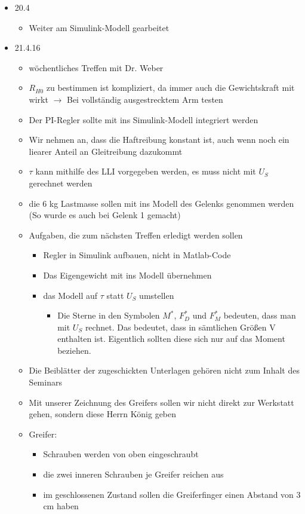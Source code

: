 \documentclass[a4paper,12pt]{article}
\begin{document}
\begin{itemize}
	\item 20.4
	\begin{itemize}
		\item Weiter am Simulink-Modell gearbeitet
	\end{itemize}
	\item 21.4.16
	\begin{itemize}
		\item wöchentliches Treffen mit Dr. Weber
		\item $R_{H0}$ zu bestimmen ist kompliziert, da immer auch die Gewichtskraft mit wirkt $\rightarrow$ Bei vollständig ausgestrecktem Arm testen
		\item Der PI-Regler sollte mit ins Simulink-Modell integriert werden
		\item Wir nehmen an, dass die Haftreibung konstant ist, auch wenn noch ein liearer Anteil an Gleitreibung dazukommt
		\item $\tau$ kann mithilfe des LLI vorgegeben werden, es muss nicht mit $U_S$ gerechnet werden
		\item die 6 kg Lastmasse sollen mit ins Modell des Gelenks genommen werden (So wurde es auch bei Gelenk 1 gemacht)
		\item Aufgaben, die zum nächsten Treffen erledigt werden sollen
			\begin{itemize}
				\item Regler in Simulink aufbauen, nicht in Matlab-Code
				\item Das Eigengewicht mit ins Modell übernehmen
				\item das Modell auf $\tau$ statt $U_S$ umstellen
				\begin{itemize}
					\item Die Sterne in den Symbolen $M^*$, $F_D^*$ und $F_M^*$ bedeuten, dass man mit $U_S$ rechnet. Das bedeutet, dass in sämtlichen Größen V enthalten ist. Eigentlich sollten diese sich nur auf das Moment beziehen.
				\end{itemize}
			\end{itemize}
		\item Die Beiblätter der zugeschickten Unterlagen gehören nicht zum Inhalt des Seminars
		\item Mit unserer Zeichnung des Greifers sollen wir nicht direkt zur Werkstatt gehen, sondern diese Herrn König geben
		\item Greifer:
		\begin{itemize}
			\item Schrauben werden von oben eingeschraubt
			\item die zwei inneren Schrauben je Greifer reichen aus
			\item im geschlossenen Zustand sollen die Greiferfinger einen Abstand von 3 cm haben
		\end{itemize}
	\end{itemize}
\end{itemize}
\end{document}
